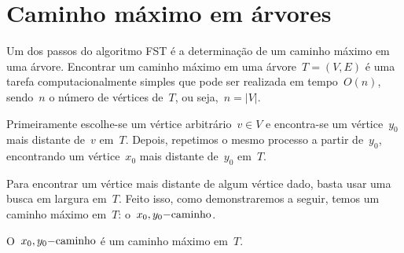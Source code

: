 \section{Caminho máximo em árvores}
\label{sec:caminhoMaximo}
	Um dos passos do algoritmo FST é a determinação 
	de um caminho máximo em uma árvore.
	Encontrar um caminho máximo em uma árvore~$T=(V,E)$ é uma 
	tarefa computacionalmente simples que pode ser realizada em 
	tempo~$O(n)$, sendo~$n$ o número de vértices de~$T$, ou 
	seja,~${n =|V|}$. 

	Primeiramente escolhe-se um vértice arbitrário~$v \in V$ e 
	encontra-se um vértice~$y_0$ mais distante de~$v$ em~$T$.
	Depois, repetimos o mesmo processo a partir de~$y_0$, 
	encontrando um vértice~$x_0$ mais distante de~$y_0$ em~$T$.

	Para encontrar um vértice mais distante de algum vértice dado, 
	basta usar uma busca em largura em~$T$.  
	Feito isso, como demonstraremos a seguir,
	temos um caminho máximo em~$T$: o~$x_0,y_0\mathrm{-caminho}$.

	\bigskip

	\begin{lem}
	\label{lema:caminhoMax}
		O~$x_0,y_0\mathrm{-caminho}$ é um caminho máximo em~$T$.
	\end{lem}

	\bigskip

